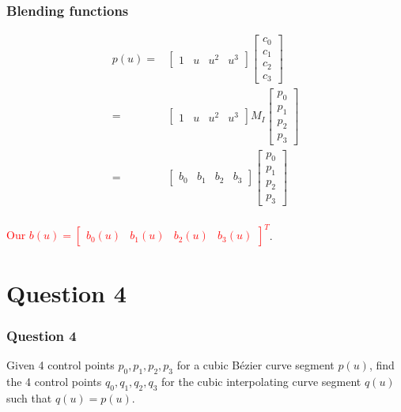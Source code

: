 \documentclass{beamer}
\begin{document}
\begin{frame}
    \frametitle{Blending functions}

    \begin{eqnarray*}
        p(u) =& 
            \begin{bmatrix}
                1 & u & u^2 & u^3
            \end{bmatrix}
            \begin{bmatrix}
                c_{0} \\ c_{1} \\ c_{2} \\ c_{3}
            \end{bmatrix}\\
            =&
            \begin{bmatrix}
                1 & u & u^2 & u^3
            \end{bmatrix} M_I \begin{bmatrix}
                p_0 \\ p_1 \\ p_2 \\ p_3
            \end{bmatrix}\\
            =&
            \begin{bmatrix}
                b_0 & b_1 & b_2 & b_3
            \end{bmatrix}
            \begin{bmatrix}
                p_0 \\ p_1 \\ p_2 \\ p_3
            \end{bmatrix}\\
    \end{eqnarray*}

    \textcolor{red}{Our $b(u) = \begin{bmatrix}
        b_0(u) & b_1(u) & b_2(u) & b_3(u)
    \end{bmatrix}^T$}.

\end{frame}

\section{Question 4}

\begin{frame}
    \frametitle{Question 4}
    Given 4 control points $p_0, p_1, p_2, p_3$ for a cubic Bézier curve segment $p(u)$, 
    find the 4 control points $q_0, q_1, q_2, q_3$ for the cubic interpolating curve segment $q(u)$
    such that $q(u) = p(u)$.
\end{frame}
\end{document}
